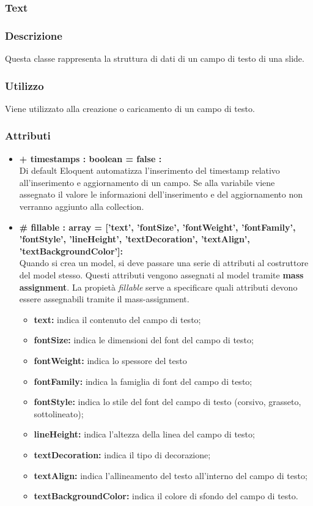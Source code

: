 	
\newpage
\subsubsection{Text}


	\subsubsection*{Descrizione}
	Questa classe rappresenta la struttura di dati di un campo di testo di una slide.
	
	\subsubsection*{Utilizzo}
	Viene utilizzato alla creazione o caricamento di un campo di testo.
	
	\subsubsection*{Attributi}
	\begin{itemize}
		\item \textbf{+ timestamps : boolean = false :}\\
		Di default Eloquent automatizza l'inserimento del timestamp relativo all'inserimento e aggiornamento di un campo. Se alla variabile viene assegnato il valore le informazioni dell'inserimento e del aggiornamento non verranno aggiunto alla collection.
		\item \textbf{\# fillable : array = [’text’, ’fontSize’, ’fontWeight’, ’fontFamily’, ’fontStyle’, ’lineHeight’, ’textDecoration’, ’textAlign’, ’textBackgroundColor']:}\\
		Quando si crea un model, si deve passare una serie di attributi al costruttore del model stesso. Questi attributi vengono assegnati al model tramite \textbf{mass assignment}. La propietà \textit{fillable} serve a specificare quali attributi devono essere assegnabili tramite il mass-assignment.
		\begin{itemize}
			\item \textbf{text:} indica il contenuto del campo di testo;
			\item \textbf{fontSize:} indica le dimensioni del font del campo di testo;
			\item \textbf{fontWeight:} indica lo spessore del testo
			\item \textbf{fontFamily:} indica la famiglia di font del campo di testo;
			\item \textbf{fontStyle:} indica lo stile del font del campo di testo (corsivo, grasseto, sottolineato);
			\item \textbf{lineHeight:} indica l'altezza della linea del campo di testo;
			\item \textbf{textDecoration:} indica il tipo di decorazione;
			\item \textbf{textAlign:} indica l'allineamento del testo all'interno del campo di testo;
			\item \textbf{textBackgroundColor:} indica il colore di sfondo del campo di testo.
		\end{itemize}

	\end{itemize}

